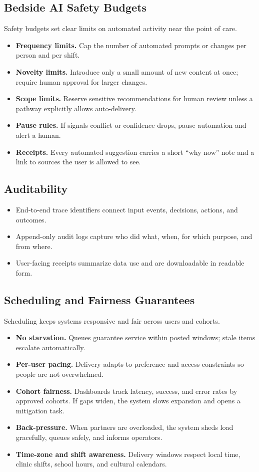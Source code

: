 \documentclass[12pt]{article}
\begin{document}
\subsection*{Bedside AI Safety Budgets}
Safety budgets set clear limits on automated activity near the point of care.
\begin{itemize}[leftmargin=*]
  \item \textbf{Frequency limits.} Cap the number of automated prompts or changes per person and per shift.
  \item \textbf{Novelty limits.} Introduce only a small amount of new content at once; require human approval for larger changes.
  \item \textbf{Scope limits.} Reserve sensitive recommendations for human review unless a pathway explicitly allows auto-delivery.
  \item \textbf{Pause rules.} If signals conflict or confidence drops, pause automation and alert a human.
  \item \textbf{Receipts.} Every automated suggestion carries a short “why now” note and a link to sources the user is allowed to see.
\end{itemize}

\subsection*{Auditability}
\begin{itemize}[leftmargin=*]
  \item End-to-end trace identifiers connect input events, decisions, actions, and outcomes.
  \item Append-only audit logs capture who did what, when, for which purpose, and from where.
  \item User-facing receipts summarize data use and are downloadable in readable form.
\end{itemize}

\subsection*{Scheduling and Fairness Guarantees}
Scheduling keeps systems responsive and fair across users and cohorts.
\begin{itemize}[leftmargin=*]
  \item \textbf{No starvation.} Queues guarantee service within posted windows; stale items escalate automatically.
  \item \textbf{Per-user pacing.} Delivery adapts to preference and access constraints so people are not overwhelmed.
  \item \textbf{Cohort fairness.} Dashboards track latency, success, and error rates by approved cohorts. If gaps widen, the system slows expansion and opens a mitigation task.
  \item \textbf{Back-pressure.} When partners are overloaded, the system sheds load gracefully, queues safely, and informs operators.
  \item \textbf{Time-zone and shift awareness.} Delivery windows respect local time, clinic shifts, school hours, and cultural calendars.
\end{itemize}
\end{document}
